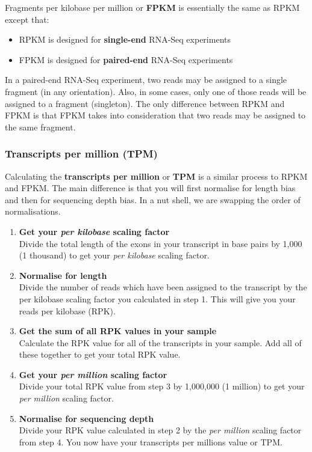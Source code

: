 \documentclass[11pt]{article}
\begin{document}
Fragments per kilobase per million or \textbf{FPKM} is essentially the
same as RPKM except that:

\begin{itemize}
\item
  RPKM is designed for \textbf{single-end} RNA-Seq experiments
\item
  FPKM is designed for \textbf{paired-end} RNA-Seq experiments
\end{itemize}

In a paired-end RNA-Seq experiment, two reads may be assigned to a
single fragment (in any orientation). Also, in some cases, only one of
those reads will be assigned to a fragment (singleton). The only
difference between RPKM and FPKM is that FPKM takes into consideration
that two reads may be assigned to the same fragment.

    \hypertarget{transcripts-per-million-tpm}{%
\subsubsection{Transcripts per million
(TPM)}\label{transcripts-per-million-tpm}}

Calculating the \textbf{transcripts per million} or \textbf{TPM} is a
similar process to RPKM and FPKM. The main difference is that you will
first normalise for length bias and then for sequencing depth bias. In a
nut shell, we are swapping the order of normalisations.

\begin{enumerate}
\def\labelenumi{\arabic{enumi}.}
\item
  \textbf{Get your \textit{per kilobase} scaling factor}\\
  Divide the total length of the exons in your transcript in base pairs
  by 1,000 (1 thousand) to get your \textit{per kilobase} scaling factor.
\item
  \textbf{Normalise for length}\\
  Divide the number of reads which have been assigned to the transcript
  by the per kilobase scaling factor you calculated in step 1. This will
  give you your reads per kilobase (RPK).
\item
  \textbf{Get the sum of all RPK values in your sample}\\
  Calculate the RPK value for all of the transcripts in your sample. Add
  all of these together to get your total RPK value.
\item
  \textbf{Get your \textit{per million} scaling factor}\\
  Divide your total RPK value from step 3 by 1,000,000 (1 million) to
  get your \textit{per million} scaling factor.
\item
  \textbf{Normalise for sequencing depth}\\
  Divide your RPK value calculated in step 2 by the \textit{per million}
  scaling factor from step 4. You now have your transcripts per millions
  value or TPM.
\end{enumerate}
\end{document}
